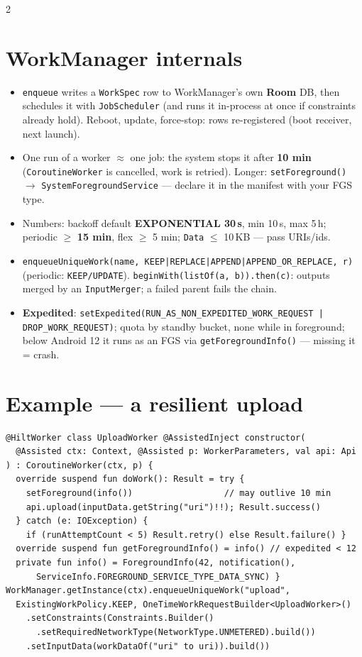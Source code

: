 \documentclass[8pt]{extarticle}
\begin{document}
\begin{multicols}{2}
\raggedright

\section{WorkManager internals}
\begin{itemize}\raggedright
  \item \texttt{enqueue} writes a \texttt{WorkSpec} row to WorkManager's own \textbf{Room} DB, then
        schedules it with \texttt{JobScheduler} (and runs it in-process at once if constraints
        already hold). Reboot, update, force-stop: rows re-registered (boot receiver, next launch).
  \item One run of a worker $\approx$ one job: the system stops it after \textbf{10 min}
        (\texttt{CoroutineWorker} is cancelled, work is retried). Longer: \texttt{setForeground()}
        $\to$ \texttt{SystemForegroundService} — declare it in the manifest with your FGS type.
  \item Numbers: backoff default \textbf{EXPONENTIAL 30\,s}, min 10\,s, max 5\,h; periodic
        $\geq$ \textbf{15 min}, flex $\geq$ 5 min; \texttt{Data} $\leq$ 10\,KB — pass URIs/ids.
  \item \texttt{enqueueUniqueWork(name, KEEP|REPLACE|APPEND|APPEND\_OR\_REPLACE, r)} (periodic:
        \texttt{KEEP/UPDATE}). \texttt{beginWith(listOf(a, b)).then(c)}: outputs merged by an
        \texttt{InputMerger}; a failed parent fails the chain.
  \item \textbf{Expedited}: \texttt{setExpedited(RUN\_AS\_NON\_EXPEDITED\_WORK\_REQUEST |
        DROP\_WORK\_REQUEST)}; quota by standby bucket, none while in foreground; below Android
        12 it runs as an FGS via \texttt{getForegroundInfo()} — missing it = crash.
\end{itemize}

\section{Example — a resilient upload}
\begin{lstlisting}[language=KotlinSheet]
@HiltWorker class UploadWorker @AssistedInject constructor(
  @Assisted ctx: Context, @Assisted p: WorkerParameters, val api: Api
) : CoroutineWorker(ctx, p) {
  override suspend fun doWork(): Result = try {
    setForeground(info())                  // may outlive 10 min
    api.upload(inputData.getString("uri")!!); Result.success()
  } catch (e: IOException) {
    if (runAttemptCount < 5) Result.retry() else Result.failure() }
  override suspend fun getForegroundInfo() = info() // expedited < 12
  private fun info() = ForegroundInfo(42, notification(),
      ServiceInfo.FOREGROUND_SERVICE_TYPE_DATA_SYNC) }
WorkManager.getInstance(ctx).enqueueUniqueWork("upload",
  ExistingWorkPolicy.KEEP, OneTimeWorkRequestBuilder<UploadWorker>()
    .setConstraints(Constraints.Builder()
      .setRequiredNetworkType(NetworkType.UNMETERED).build())
    .setInputData(workDataOf("uri" to uri)).build())
\end{lstlisting}


\end{multicols}
\end{document}
